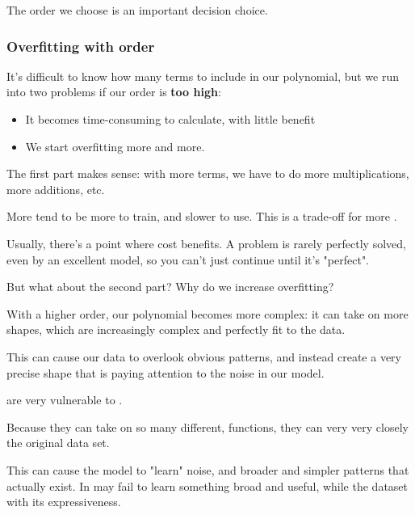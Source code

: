                 \phantom{}

                The order we choose is an important decision choice.
                
            \subsecdiv

            \subsubsection*{Overfitting with order}
                It's difficult to know how many terms to include in our polynomial, but we run into two problems if our order is \textbf{too high}:

                \begin{itemize}
                    \item It becomes time-consuming to calculate, with little benefit
                    \item We start overfitting more and more.
                \end{itemize}

                The first part makes sense: with more terms, we have to do more multiplications, more additions, etc.\\
                
                \begin{concept}
                    More  tend to be more  to train, and slower to use. This is a trade-off for more . 
                    
                    Usually, there's a point where cost  benefits. A problem is rarely perfectly solved, even by an excellent model, so you can't just continue until it's "perfect".
                \end{concept}

                But what about the second part? Why do we increase overfitting? 

                With a higher order, our polynomial becomes more complex: it can take on more shapes, which are increasingly complex and perfectly fit to the data.

                This can cause our data to overlook obvious patterns, and instead create a very precise shape that is paying attention to the noise in our model.\\

                \begin{concept}
                     are very vulnerable to .

                    Because they can take on so many different,  functions, they can very very closely  the original data set. 
                    
                    This can cause the model to "learn" noise, and  broader and simpler patterns that actually exist. In may fail to learn something broad and useful, while  the dataset with its expressiveness.
                \end{concept}

